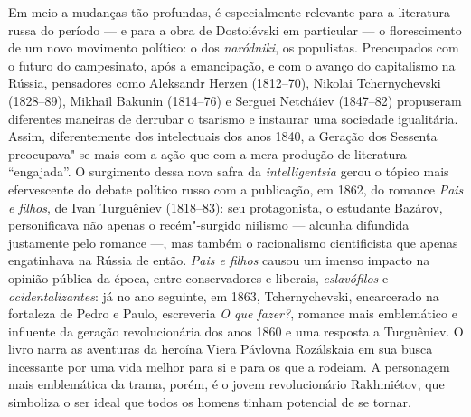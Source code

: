 Em meio a mudanças tão profundas, é especialmente relevante para a literatura
russa do período --- e para a obra de Dostoiévski em particular --- o florescimento
de um novo movimento político: o dos \textit{naródniki}, os populistas.
Preocupados com o futuro do campesinato, após a emancipação, e com o avanço do
capitalismo na Rússia, pensadores como Aleksandr Herzen (1812--70), Nikolai
Tchernychevski (1828--89), Mikhail Bakunin (1814--76) e Serguei Netcháiev
(1847--82) propuseram diferentes maneiras de derrubar o tsarismo e instaurar uma
sociedade igualitária. Assim, diferentemente dos intelectuais dos anos 1840, 
a Geração dos Sessenta preocupava"-se mais com a ação que com a mera
produção de literatura “engajada”. O surgimento dessa nova safra da
\textit{intelligentsia} gerou o tópico mais efervescente do debate político
russo com a publicação, em 1862, do romance \textit{Pais e filhos}, de Ivan
Turguêniev (1818--83): seu protagonista, o estudante Bazárov, personificava não
apenas o recém"-surgido niilismo --- alcunha difundida justamente pelo
romance ---, mas também o racionalismo cientificista que apenas engatinhava na
Rússia de então. \textit{Pais e filhos} causou um imenso impacto na opinião
pública da época, entre conservadores e liberais, \textit{eslavófilos} e
\textit{ocidentalizantes}: já no ano seguinte, em 1863, Tchernychevski,
encarcerado na fortaleza de Pedro e Paulo, escreveria \textit{O que fazer?},
romance mais emblemático e influente da geração revolucionária dos anos 1860 e
uma resposta a Turguêniev. O livro narra as aventuras da heroína
Viera Pávlovna Rozálskaia em sua busca incessante por uma vida melhor para si e
para os que a rodeiam. A personagem mais emblemática da trama, porém, é
o jovem revolucionário Rakhmiétov, que simboliza o ser ideal que todos
os homens tinham potencial de se tornar.

